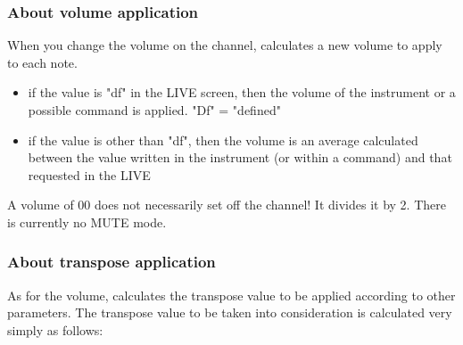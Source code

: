 \subsubsection{About volume application}

When you change the volume on the channel, \FAT calculates a new volume to apply to each note.
\medskip

\begin{itemize}
    \item{if the value is "df" in the LIVE screen, then the volume of the instrument or a possible command is applied. "Df" = "defined"}
    \item{if the value is other than "df", then the volume is an average calculated between the value written in the instrument (or within a command) and that requested in the LIVE}
\end{itemize}
\medskip

A volume of 00 does not necessarily set off the channel! It divides it by 2.
There is currently no MUTE mode.


\subsubsection{About transpose application}

As for the volume, \FAT calculates the transpose value to be applied according to other parameters.
The transpose value to be taken into consideration is calculated very simply as follows:

